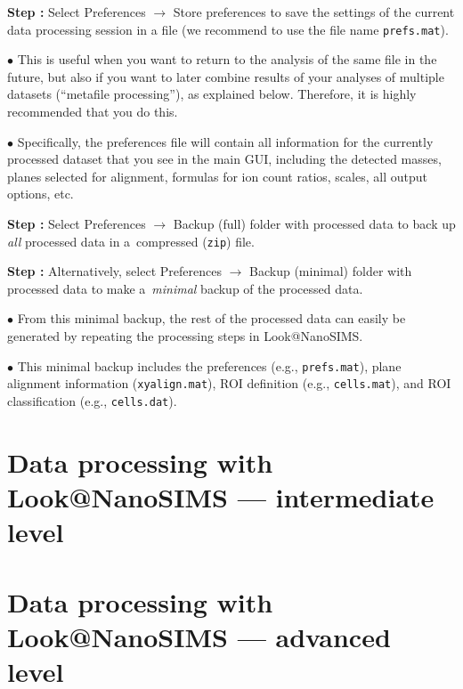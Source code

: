 \documentclass[a4paper, 11pt]{article}
\newcommand{\ttt}[1]{\texttt{#1}}
\newcommand{\lans}[1]{{\color{magenta}#1}}
\newcommand\ra{\rightarrow}
\newcommand\addon[1]{-- {\small #1}}
\newcounter{step}
\newcommand\s{\addtocounter{step}{1}\noindent\textbf{Step \thestep:}{ }}
\newcommand\bul{\noindent$\bullet${ }}
\begin{document}
\s Select \lans{Preferences} $\ra$ \lans{Store preferences} to save the settings of the current data processing session in a file (we recommend to use the file name \ttt{prefs.mat}). 

\bul This is useful when you want to return to the analysis of the same file in the future, but also if you want to later combine results of your analyses of multiple datasets (``metafile processing''), as explained below. Therefore, it is highly recommended that you do this.

\bul Specifically, the preferences file will contain all information for the currently processed dataset that you see in the main GUI, including the detected masses, planes selected for alignment, formulas for ion count ratios, scales, all output options, etc.

\s Select \lans{Preferences} $\ra$ \lans{Backup (full) folder with processed data} to back up \emph{all} processed data in a~compressed (\ttt{zip}) file.

\s Alternatively, select \lans{Preferences} $\ra$ \lans{Backup (minimal) folder with processed data} to make a~\emph{minimal} backup of the processed data.

\bul From this minimal backup, the rest of the processed data can easily be generated by repeating the processing steps in Look@NanoSIMS. 

\bul This minimal backup includes the preferences (e.g., \ttt{prefs.mat}), plane alignment information (\ttt{xyalign.mat}), ROI definition (e.g., \ttt{cells.mat}), and ROI classification (e.g., \ttt{cells.dat}).


\section{Data processing with Look@NanoSIMS --- intermediate level}
\label{sec:level2}


\section{Data processing with Look@NanoSIMS --- advanced level}
\label{sec:level3}


\end{document}
